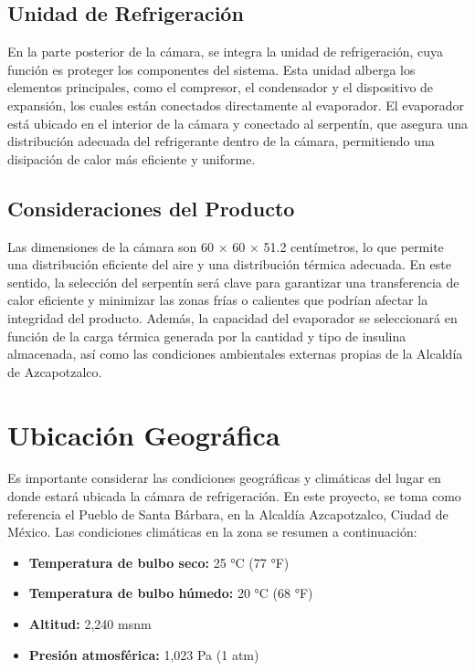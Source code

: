  \subsection{Unidad de Refrigeración}
 En la parte posterior de la cámara, se integra la unidad de refrigeración, cuya función es proteger los componentes del sistema. Esta unidad alberga los elementos principales, como el compresor, el condensador y el dispositivo de expansión, los cuales están conectados directamente al evaporador. El evaporador está ubicado en el interior de la cámara y conectado al serpentín, que asegura una distribución adecuada del refrigerante dentro de la cámara, permitiendo una disipación de calor más eficiente y uniforme.
 
 \subsection{Consideraciones del Producto}
 Las dimensiones de la cámara son 60 × 60 × 51.2 centímetros, lo que permite una distribución eficiente del aire y una distribución térmica adecuada. En este sentido, la selección del serpentín será clave para garantizar una transferencia de calor eficiente y minimizar las zonas frías o calientes que podrían afectar la integridad del producto. Además, la capacidad del evaporador se seleccionará en función de la carga térmica generada por la cantidad y tipo de insulina almacenada, así como las condiciones ambientales externas propias de la Alcaldía de Azcapotzalco.
 
 \section{Ubicación Geográfica}
 Es importante considerar las condiciones geográficas y climáticas del lugar en donde estará ubicada la cámara de refrigeración. En este proyecto, se toma como referencia el Pueblo de Santa Bárbara, en la Alcaldía Azcapotzalco, Ciudad de México. Las condiciones climáticas en la zona se resumen a continuación:
 
 \begin{itemize}
 	\item \textbf{Temperatura de bulbo seco:} 25 °C (77 °F)
 	\item \textbf{Temperatura de bulbo húmedo:} 20 °C (68 °F)
 	\item \textbf{Altitud:} 2,240 msnm
 	\item \textbf{Presión atmosférica:} 1,023 Pa (1 atm)
 \end{itemize}
 
